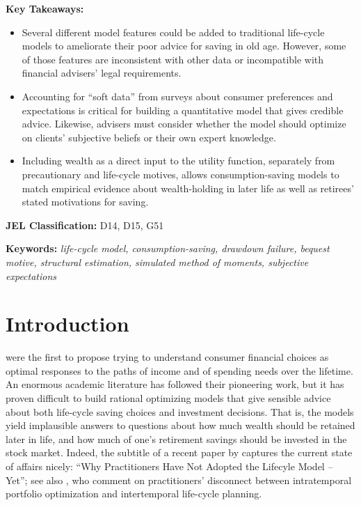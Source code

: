 \documentclass[12pt,letterpaper, fleqn]{article}
\begin{document}
\vspace{0.5cm}

\noindent \textbf{Key Takeaways:}

\begin{itemize}
	\item Several different model features could be added to traditional life-cycle models to ameliorate their poor advice for saving in old age. However, some of those features are inconsistent with other data or incompatible with financial advisers' legal requirements.

	\item Accounting for ``soft data'' from surveys about consumer preferences and expectations is critical for building a quantitative model that gives credible advice. Likewise, advisers must consider whether the model should optimize on clients' subjective beliefs or their own expert knowledge.

	\item Including wealth as a direct input to the utility function, separately from precautionary and life-cycle motives, allows consumption-saving models to match empirical evidence about wealth-holding in later life as well as retirees' stated motivations for saving.
\end{itemize}

\vspace{0.5cm}

\textbf{JEL Classification:} D14, D15, G51

\vspace{1cm}

\textbf{Keywords:} \textit{life-cycle model, consumption-saving, drawdown failure, bequest motive, structural estimation, simulated method of moments, subjective expectations}


\thispagestyle{empty}

\setcounter{page}{0}

\newpage

\section{Introduction}

\cite{modigliani1954} were the first to propose trying to understand consumer financial choices as optimal responses to the paths of income and of spending needs over the lifetime.
An enormous academic literature has followed their pioneering work,
but it has proven difficult to build rational optimizing models that give sensible advice about both life-cycle saving choices and investment decisions.
That is, the models yield implausible answers to questions about how much wealth should be retained later in life, and how much of one's retirement savings should be invested in the stock market.
Indeed, the subtitle of a recent paper by \cite{Daga_2023} captures the current state of affairs nicely: ``Why Practitioners Have Not Adopted the Lifecyle Model -- Yet''; see also \cite{Idzorek_2024}, who comment on practitioners' disconnect between intratemporal portfolio optimization and intertemporal life-cycle planning.
\end{document}
